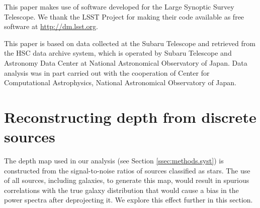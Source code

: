 \documentclass[a4paper,11pt]{article}
\begin{document}
  This paper makes use of software developed for the Large Synoptic Survey Telescope. We thank the LSST Project for making their code available as free software at \url{http://dm.lsst.org}.

  This paper is based on data collected at the Subaru Telescope and retrieved from the HSC data archive system, which is operated by Subaru Telescope and Astronomy Data Center at National Astronomical Observatory of Japan. Data analysis was in part carried out with the cooperation of Center for Computational Astrophysics, National Astronomical Observatory of Japan.

\appendix
{}

\section{Reconstructing depth from discrete sources}\label{app:depth}
  The depth map used in our analysis (see Section \ref{ssec:methods.syst}) is constructed from the signal-to-noise ratios of sources classified as stars. The use of all sources, including galaxies, to generate this map, would result in spurious correlations with the true galaxy distribution that would cause a bias in the power spectra after deprojecting it. We explore this effect further in this section.
  
\end{document}
